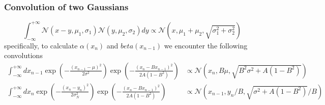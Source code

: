 \documentclass[%
 reprint,
 amsmath,amssymb,
 aps,
]{revtex4-1}
\begin{document}
\subsubsection{Convolution of two Gaussians}
\begin{equation}
\int_{-\infty}^{+\infty}\mathcal{N}(x-y,\mu_{1},\sigma_{1})\mathcal{N}(y,\mu_{2},\sigma_{2})dy
	\propto\mathcal{N}\left(x,\mu_{1}+\mu_{2},\sqrt{\sigma_{1}^2+\sigma_{2}^2}\right)
\end{equation}
specifically, to calculate $\alpha(x_{n})$ and $beta(x_{n-1})$ we encounter the following convolutions
\begin{equation}
	\begin{aligned}
	\int_{-\infty}^{+\infty}dx_{n-1}
	\exp \left( -\frac{{{{\left( {x_{n-1} - \mu} \right)}^2}}}{{2\sigma^{2}}} \right)
	\exp \left( -\frac{{{{\left( {x_{n} - Bx_{n-1}} \right)}^2}}}{{2A(1-B^{2})}} \right)
	&\propto \mathcal{N}\left(x_{n},B\mu,\sqrt{B^{2}\sigma^2+A(1-B^{2})}\right)\\
	\int_{-\infty}^{+\infty}dx_{n}
	\exp \left( -\frac{{{{\left( {x_{n} - y_{n}} \right)}^2}}}{{2\sigma_{N}^{2}}} \right)
	\exp \left( -\frac{{{{\left( {x_{n} - Bx_{n-1}} \right)}^2}}}{{2A(1-B^{2})}} \right)
	&\propto \mathcal{N}\left(x_{n-1},y_{n}/B,\sqrt{\sigma^2+A(1-B^{2})}/B\right)
	\end{aligned}
\end{equation}
\end{document}
